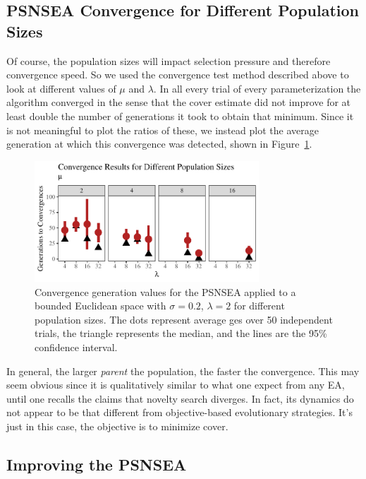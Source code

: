 \documentclass[twoside]{article}
\begin{document}
\subsection{PSNSEA Convergence for Different Population Sizes}
\label{subsec:psnsea:diffpop}

Of course, the population sizes will impact selection pressure and therefore convergence speed.  So we used the convergence test method described above to look at different values of $\mu$ and $\lambda$.  In all every trial of every parameterization the algorithm converged in the sense that the cover estimate did not improve for at least double the number of generations it took to obtain that minimum.  Since it is not meaningful to plot the ratios of these, we instead plot the average generation at which this convergence was detected, shown in Figure~\ref{fig:bounded:pop:conv}.  
%
\begin{figure}[th]
  \center\includegraphics[width=0.75\textwidth]{Figures/bounded-conv-s02-r02.pdf}
  \caption{\label{fig:bounded:pop:conv} Convergence generation values for the PSNSEA applied to a bounded Euclidean space with $\sigma=0.2$, $\lambda=2$ for different population sizes.  The dots represent average ges over 50 independent trials, the triangle represents the median, and the lines are the 95\% confidence interval.}
\end{figure}

In general, the larger \emph{parent} the population, the faster the convergence.  This may seem obvious since it is qualitatively similar to what one expect from any EA, until one recalls the claims that novelty search diverges.  In fact, its dynamics do not appear to be that different from objective-based evolutionary strategies.  It's just in this case, the objective is to minimize cover.


\subsection{Improving the PSNSEA}
\label{subsec:psnsea:improve}
\end{document}
